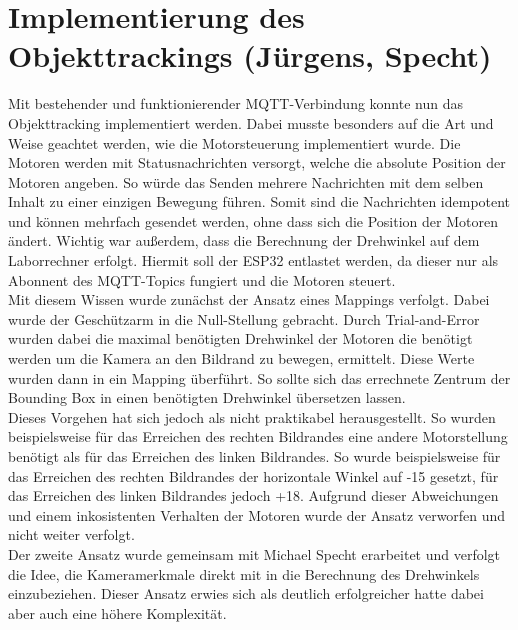 \section{Implementierung des Objekttrackings (Jürgens, Specht)}
Mit bestehender und funktionierender MQTT-Verbindung konnte nun das Objekttracking implementiert werden. Dabei musste besonders auf die Art und Weise geachtet werden, wie die Motorsteuerung implementiert wurde. Die Motoren werden mit Statusnachrichten versorgt, welche die absolute Position der Motoren angeben. So würde das Senden mehrere Nachrichten mit dem selben Inhalt zu einer einzigen Bewegung führen. Somit sind die Nachrichten idempotent und können mehrfach gesendet werden, ohne dass sich die Position der Motoren ändert.
Wichtig war außerdem, dass die Berechnung der Drehwinkel auf dem Laborrechner erfolgt. Hiermit soll der ESP32 entlastet werden, da dieser nur als Abonnent des MQTT-Topics fungiert und die Motoren steuert. 
\\
Mit diesem Wissen wurde zunächst der Ansatz eines Mappings verfolgt. Dabei wurde der Geschützarm in die Null-Stellung gebracht. Durch Trial-and-Error wurden dabei die maximal benötigten Drehwinkel der Motoren die benötigt werden um die Kamera an den Bildrand zu bewegen, ermittelt. Diese Werte wurden dann in ein Mapping überführt. So sollte sich das errechnete Zentrum der Bounding Box in einen benötigten Drehwinkel übersetzen lassen.\\
Dieses Vorgehen hat sich jedoch als nicht praktikabel herausgestellt. So wurden beispielsweise für das Erreichen des rechten Bildrandes eine andere Motorstellung benötigt als für das Erreichen des linken Bildrandes. So wurde beispielsweise für das Erreichen des rechten Bildrandes der horizontale Winkel auf -15 gesetzt, für das Erreichen des linken Bildrandes jedoch +18. Aufgrund dieser Abweichungen und einem inkosistenten Verhalten der Motoren wurde der Ansatz verworfen und nicht weiter verfolgt.
\\
Der zweite Ansatz wurde gemeinsam mit Michael Specht erarbeitet und verfolgt die Idee, die Kameramerkmale direkt mit in die Berechnung des Drehwinkels einzubeziehen. Dieser Ansatz erwies sich als deutlich erfolgreicher hatte dabei aber auch eine höhere Komplexität. %

%


